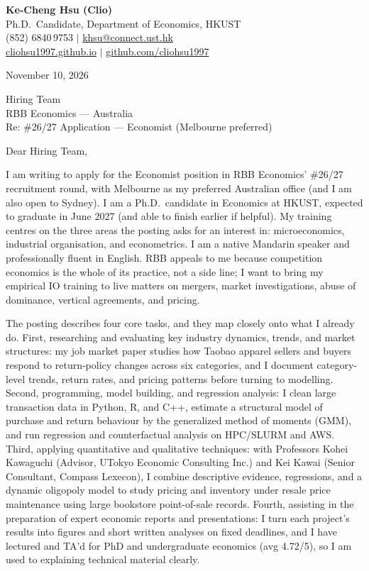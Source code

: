 \documentclass[11pt,letterpaper]{article}
\begin{document}
\noindent
{\bfseries Ke-Cheng Hsu (Clio)}\\
Ph.D.\ Candidate, Department of Economics, HKUST\\
(852) 6840\,9753 \quad $|$ \quad \href{mailto:khsu@connect.ust.hk}{khsu@connect.ust.hk}\\
\href{https://cliohsu1997.github.io/}{cliohsu1997.github.io} \quad $|$ \quad \href{https://github.com/cliohsu1997}{github.com/cliohsu1997}

\vspace{0.7em}
\noindent
November 10, 2026

\vspace{0.35em}
\noindent
Hiring Team\\
RBB Economics --- Australia\\
Re: \#26/27 Application --- Economist (Melbourne preferred)

\vspace{0.2em}
Dear Hiring Team,

I am writing to apply for the Economist position in RBB Economics' \#26/27 recruitment round, with Melbourne as my preferred Australian office (and I am also open to Sydney). I am a Ph.D.\ candidate in Economics at HKUST, expected to graduate in June 2027 (and able to finish earlier if helpful). My training centres on the three areas the posting asks for an interest in: microeconomics, industrial organisation, and econometrics. I am a native Mandarin speaker and professionally fluent in English. RBB appeals to me because competition economics is the whole of its practice, not a side line; I want to bring my empirical IO training to live matters on mergers, market investigations, abuse of dominance, vertical agreements, and pricing.

The posting describes four core tasks, and they map closely onto what I already do. First, researching and evaluating key industry dynamics, trends, and market structures: my job market paper studies how Taobao apparel sellers and buyers respond to return-policy changes across six categories, and I document category-level trends, return rates, and pricing patterns before turning to modelling. Second, programming, model building, and regression analysis: I clean large transaction data in Python, R, and C++, estimate a structural model of purchase and return behaviour by the generalized method of moments (GMM), and run regression and counterfactual analysis on HPC/SLURM and AWS. Third, applying quantitative and qualitative techniques: with Professors Kohei Kawaguchi (Advisor, UTokyo Economic Consulting Inc.) and Kei Kawai (Senior Consultant, Compass Lexecon), I combine descriptive evidence, regressions, and a dynamic oligopoly model to study pricing and inventory under resale price maintenance using large bookstore point-of-sale records. Fourth, assisting in the preparation of expert economic reports and presentations: I turn each project's results into figures and short written analyses on fixed deadlines, and I have lectured and TA'd for PhD and undergraduate economics (avg 4.72/5), so I am used to explaining technical material clearly.
\end{document}
